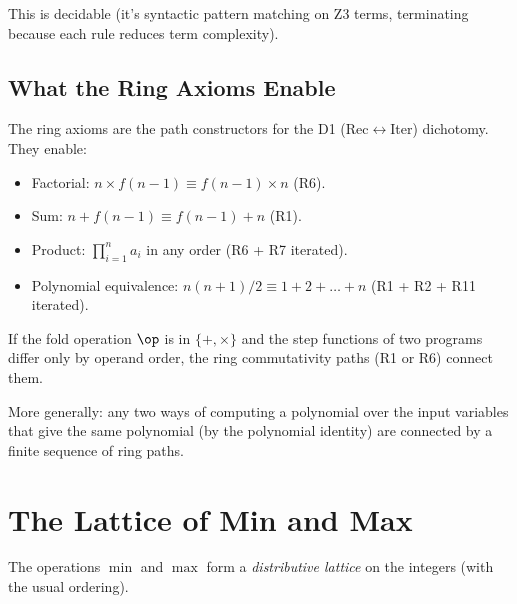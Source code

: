This is decidable (it's syntactic pattern matching on Z3 terms,
terminating because each rule reduces term complexity).

\subsection{What the Ring Axioms Enable}

The ring axioms are the path constructors for the D1
(Rec$\leftrightarrow$Iter) dichotomy.  They enable:

\begin{itemize}
  \item Factorial: $n \times f(n-1) \equiv f(n-1) \times n$ (R6).
  \item Sum: $n + f(n-1) \equiv f(n-1) + n$ (R1).
  \item Product: $\prod_{i=1}^n a_i$ in any order (R6 + R7 iterated).
  \item Polynomial equivalence: $n(n+1)/2 \equiv 1 + 2 + \ldots + n$
    (R1 + R2 + R11 iterated).
\end{itemize}

\begin{proposition}
If the fold operation $\op$ is in $\{+, \times\}$ and the step
functions of two programs differ only by operand order, the ring
commutativity paths (R1 or R6) connect them.

More generally: any two ways of computing a polynomial over the
input variables that give the same polynomial (by the polynomial
identity) are connected by a finite sequence of ring paths.
\end{proposition}


\section{The Lattice of Min and Max}

The operations $\min$ and $\max$ form a \emph{distributive lattice}
on the integers (with the usual ordering).

